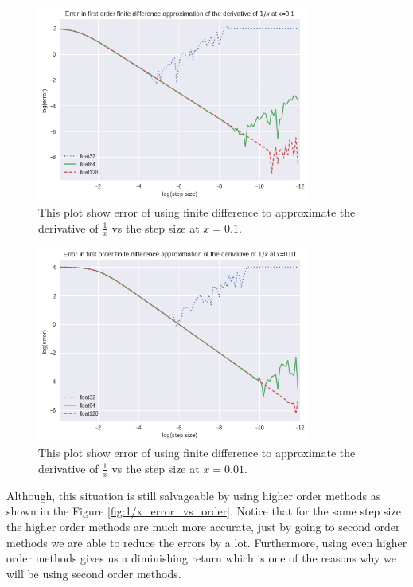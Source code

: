 \begin{figure}[hbt!]
    \centering
    \includegraphics[width=0.8\textwidth]{images/1_x_error_at_p1.png}
    \caption{This plot show error of using finite difference to approximate the derivative of $\frac{1}{x}$ vs the step size at $x = 0.1$.}
    \label{fig:1/x_0.1}
\end{figure}


\begin{figure}[hbt!]
    \centering
    \includegraphics[width=0.8\textwidth]{images/1_x_error_at_p01.png}
    \caption{This plot show error of using finite difference to approximate the derivative of $\frac{1}{x}$ vs the step size at $x = 0.01$.}
    \label{fig:1/x_0.01}
\end{figure}


Although, this situation is still salvageable by using higher order methods as shown in the Figure \ref{fig:1/x_error_vs_order}. Notice that for the same step size the higher order methods are much more accurate, just by going to second order methods we are able to reduce the errors by a lot. Furthermore, using even higher order methods gives us a diminishing return which is one of the reasons why we will be using second order methods.

